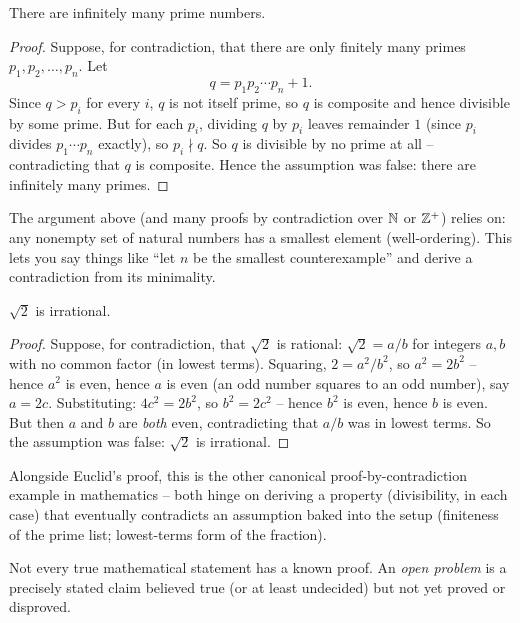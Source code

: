 \documentclass[11pt]{article}
\begin{document}
\begin{theorem}[Euclid]
There are infinitely many prime numbers.
\end{theorem}
\begin{proof}
Suppose, for contradiction, that there are only finitely many primes $p_1,p_2,\dots,p_n$. Let
\[
q = p_1 p_2 \cdots p_n + 1.
\]
Since $q > p_i$ for every $i$, $q$ is not itself prime, so $q$ is composite and hence divisible by some prime. But for each $p_i$, dividing $q$ by $p_i$ leaves remainder $1$ (since $p_i$ divides $p_1\cdots p_n$ exactly), so $p_i \nmid q$. So $q$ is divisible by no prime at all -- contradicting that $q$ is composite. Hence the assumption was false: there are infinitely many primes.
\end{proof}

\begin{note}
The argument above (and many proofs by contradiction over $\mathbb{N}$ or $\mathbb{Z}^+$) relies on: any nonempty set of natural numbers has a smallest element (well-ordering). This lets you say things like ``let $n$ be the smallest counterexample'' and derive a contradiction from its minimality.
\end{note}

\begin{theorem}
$\sqrt{2}$ is irrational.
\end{theorem}
\begin{proof}
Suppose, for contradiction, that $\sqrt2$ is rational: $\sqrt2 = a/b$ for integers $a,b$ with no common factor (in lowest terms). Squaring, $2 = a^2/b^2$, so $a^2 = 2b^2$ -- hence $a^2$ is even, hence $a$ is even (an odd number squares to an odd number), say $a = 2c$. Substituting: $4c^2 = 2b^2$, so $b^2 = 2c^2$ -- hence $b^2$ is even, hence $b$ is even. But then $a$ and $b$ are \emph{both} even, contradicting that $a/b$ was in lowest terms. So the assumption was false: $\sqrt2$ is irrational.
\end{proof}

\begin{note}
Alongside Euclid's proof, this is the other canonical proof-by-contradiction example in mathematics -- both hinge on deriving a property (divisibility, in each case) that eventually contradicts an assumption baked into the setup (finiteness of the prime list; lowest-terms form of the fraction).
\end{note}

\bigskip
\begin{note}
Not every true mathematical statement has a known proof. An \emph{open problem} is a precisely stated claim believed true (or at least undecided) but not yet proved or disproved.
\end{note}
\end{document}
